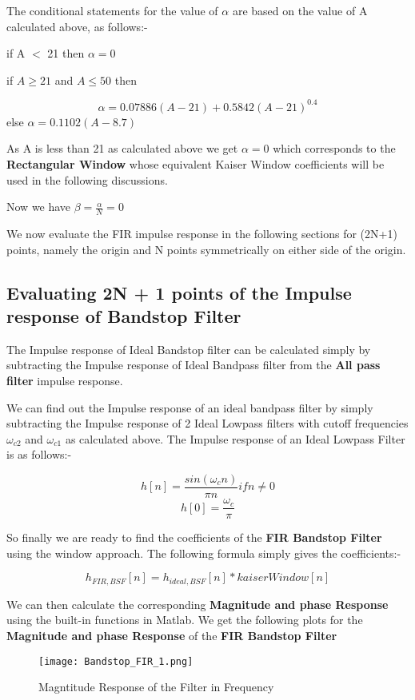 \documentclass[12pt]{article}
\begin{document}
The conditional statements for the value of $\alpha$ are based on the value of A calculated above, as follows:- \par

if A $<$ 21 then $\alpha = 0$ \par
if $A \geq 21$ and $A \leq 50$ then \par
\[\alpha = 0.07886(A - 21) + 0.5842(A - 21)^{0.4}\]
else $\alpha = 0.1102(A - 8.7)$ \par
As A is less than 21 as calculated above we get $\alpha = 0$ which corresponds to the \textbf{Rectangular Window} whose equivalent Kaiser Window coefficients will be used in the following discussions.


Now we have $\beta = \frac{\alpha}{N} = 0$

We now evaluate the FIR impulse response in the following sections for (2N+1) points, namely the origin and N points symmetrically on either side of the origin.

\subsection{Evaluating 2N + 1 points of the Impulse response of  Bandstop Filter}

The Impulse response of Ideal Bandstop filter can be calculated simply by subtracting the Impulse response of Ideal Bandpass filter from the \textbf{All pass filter} impulse response.

We can find out the Impulse response of an ideal bandpass filter by simply subtracting the Impulse response of 2 Ideal Lowpass filters with cutoff frequencies $\omega_{c2}$ and $\omega_{c1}$ as calculated above. The Impulse response of an Ideal Lowpass Filter is as follows:- 

\[h[n] = \frac{sin(\omega_{c}n)}{\pi n} if n \neq 0\]
\[h[0] = \frac{\omega_{c}}{\pi}\]

So finally we are ready to find the coefficients of the \textbf{FIR Bandstop Filter} using the window approach.
The following formula simply gives the coefficients:-

\[h_{FIR,BSF}[n] = h_{ideal,BSF}[n]*kaiserWindow[n]\]

We can then calculate the corresponding \textbf{Magnitude and phase Response} using the built-in functions in Matlab. We get the following plots for the \textbf{Magnitude and phase Response} of the \textbf{FIR Bandstop Filter}

\newpage

\begin{figure}[H]
    \centering
    \texttt{[image: Bandstop\_FIR\_1.png]}
    \caption{Magntitude Response of the Filter in Frequency}
\end{figure}
\end{document}
